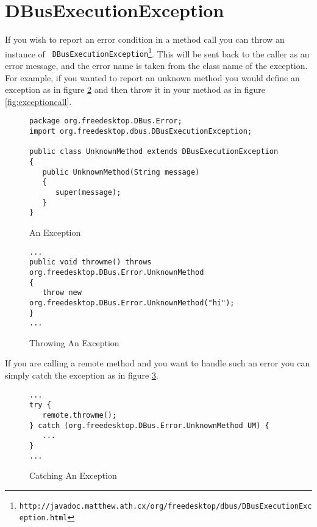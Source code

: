 \documentclass[a4paper,12pt]{article}
\begin{document}
\section{DBusExecutionException}

If you wish to report an error condition in a method call you can throw an
instance of {\tt
DBusExecutionException\footnote{http://javadoc.matthew.ath.cx/org/freedesktop/dbus/DBusExecutionException.html}}.
This will be sent back to the caller as an error message, and the error name is
taken from the class name of the exception. For example, if you wanted to
report an unknown method you would define an exception as in figure
\ref{fig:exceptiondef} and then throw it in your method as in figure
\ref{fig:exceptioncall}.

\begin{figure}[htb]
\begin{center}
\begin{verbatim}
package org.freedesktop.DBus.Error;
import org.freedesktop.dbus.DBusExecutionException;

public class UnknownMethod extends DBusExecutionException
{
   public UnknownMethod(String message)
   {
      super(message);
   }
}
\end{verbatim}
\end{center}
\caption{An Exception}
\label{fig:exceptiondef}
\end{figure}

\begin{figure}[htb]
\begin{center}
\begin{verbatim}
...
public void throwme() throws org.freedesktop.DBus.Error.UnknownMethod
{
   throw new org.freedesktop.DBus.Error.UnknownMethod("hi");
}
...
\end{verbatim}
\end{center}
\caption{Throwing An Exception}
\label{fig:exceptiondef}
\end{figure}

If you are calling a remote method and you want to handle such an error you can
simply catch the exception as in figure \ref{fig:exceptioncatch}. 

\begin{figure}[htb]
\begin{center}
\begin{verbatim}
...
try {
   remote.throwme();
} catch (org.freedesktop.DBus.Error.UnknownMethod UM) {
   ...
}
...
\end{verbatim}
\end{center}
\caption{Catching An Exception}
\label{fig:exceptioncatch}
\end{figure}
\end{document}
